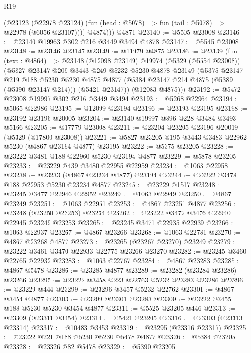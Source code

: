 \begin{lexlean}{R19}
\begin{coremodule}
          (@23123
            (@22978 @23124)
            (fun (head : @5078) => fun (tail : @5078) => @22978 (@6056 @23107))))
          @4874)))
    @4871
@23140 := @5505 @23008
@23146 := @23140 @19963 @302 @216 @3449 @3494 @4878
@23147 := @5545 @23008
@23148 := @23146 @23147
@23149 := @11979 @4875
@23186 := @23139
    (fun (text : @4864) =>
    @23148
      (@12098 @23149)
      @19974
      (@5329 (@5554 @23008))
      (@5827
        @23147
        @209
        @3443
        @249
        @5232
        @5230
        @4878
        @23149
        (@5375
          @23147
          @219
          @188
          @5230
          @5230
          @4875
          @4877
          (@5384 @23147 @214 @4875 (@5389 (@5390 @23147 @214)))
          (@5421 @23147))
        (@12083 @4875)))
@23192 := @5472 @23008 @19997 @302 @216 @3449 @3494
@23193 := @5268 @22964
@23194 := @5065 @22986
@23195 := @12099 @23194
@23196 := @23193 @23195
@23198 := @23192 @23196 @20005
@23204 := @23140 @19997 @896 @228 @3484 @3493 @5166
@23205 := @17779 @23008
@23211 := @23204 @23205 @23196 @20019 (@5329 (@17800 @23008))
@23221 := @5827 @23205 @195 @3443 @3483 @22962 @5230 (@4867 @23194 @4877) @23195
@23222 := @5375 @23205
@23228 := @23222 @3481 @188 @22960 @5230 @23194 @4877
@23229 := @5878 @23205
@23233 := @23229 @439 @3480 @22955 @22959
@23234 := @1063 @22958
@23238 := @23233 (@4867 @23234 @4877) @23194
@23244 := @23222 @3478 @188 @22953 @5230 @23234 @4877
@23245 := @23229 @1517
@23248 := @23245 @3477 @22946 @22952
@23249 := @1063 @22949
@23250 := @4867 @23249
@23251 := @1063 @22951
@23253 := @4867 @23251 @4877
@23256 := @23248 (@23250 @23253) @23234
@23262 := @23222 @3472 @3476 @22940 @22945 @23249 @23253
@23265 := @23245 @3471 @22935 @22939
@23266 := @1063 @22937
@23267 := @4867 @23266
@23268 := @1063 @22781
@23270 := @4867 @23268 @4877
@23273 := @23265 (@23267 @23270) @23249
@23279 := @23222 @3461 @3470 @22933 @22775 @23266 @23270
@23282 := @23245 @3460 @22765 @22932
@23283 := @1063 @22767
@23284 := @4867 @23283
@23285 := @4867 @5478
@23286 := @23285 @4877
@23289 := @23282 (@23284 @23286) @23266
@23295 := @23222 @3458 @223 @22763 @5232 @23283 @23286
@23296 := @23229 @444
@23299 := @23296 @3457 @5232 @22762
@23301 := @4867 @3454 @4877
@23303 := @23299 @23301 @23283
@23309 := @23222 @3455 @188 @5230 @5230 @3454 @4877
@23311 := @5525 @23205 @446
@23313 := @23309 (@23311 @3454)
@23314 := @5421 @23205
@23316 := @23303 (@23313 @23314)
@23317 := @10483 @3453
@23319 := @23295 (@23316 @23317)
@23325 := @23222 @221 @188 @5230 @5230 @5478 @4877
@23326 := @5384 @23205
@23328 := @23326 @82 @5478
@23329 := @5390 @23205

\end{coremodule}
\end{lexlean}

